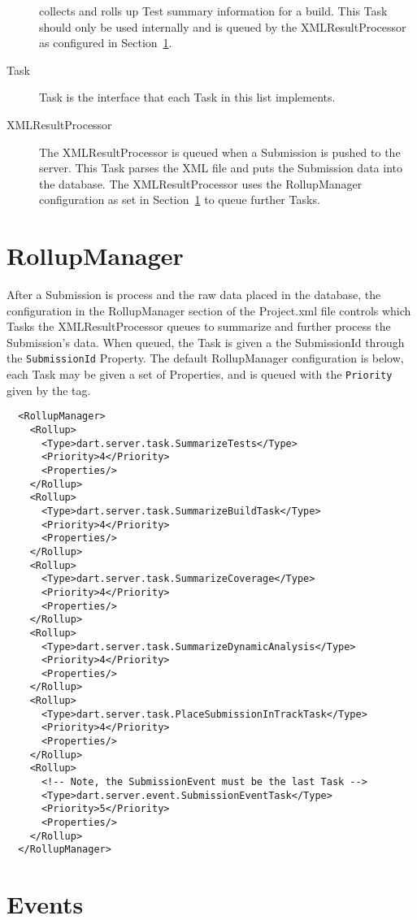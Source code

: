 \documentclass{InsightBook}
\begin{document}
\begin{description}
  collects and rolls up Test summary information for a build.
  This Task should only be used internally and is queued by the
  XMLResultProcessor as configured in Section~\ref{Section:RollupManager}.
  \item[Task] Task is the interface that each Task in this list implements.
  \item[XMLResultProcessor] The XMLResultProcessor is queued when a
  Submission is pushed to the server.  This Task parses the XML file
  and puts the Submission data into the database.  The
  XMLResultProcessor uses the RollupManager configuration as set in
  Section~\ref{Section:RollupManager} to queue further Tasks.
\end{description}

\section{RollupManager}
\label{Section:RollupManager}
After a Submission is process and the raw data placed in the database,
the configuration in the RollupManager section of the Project.xml file
controls which Tasks the XMLResultProcessor queues to summarize and
further process the Submission's data.  When queued, the Task is given
a the SubmissionId through the \texttt{SubmissionId} Property.  The
default RollupManager configuration is below, each Task may be given a
set of Properties, and is queued with the \texttt{Priority} given by
the tag.

\begin{verbatim}
  <RollupManager>
    <Rollup>
      <Type>dart.server.task.SummarizeTests</Type>
      <Priority>4</Priority>
      <Properties/>
    </Rollup>
    <Rollup>
      <Type>dart.server.task.SummarizeBuildTask</Type>
      <Priority>4</Priority>
      <Properties/>
    </Rollup>
    <Rollup>
      <Type>dart.server.task.SummarizeCoverage</Type>
      <Priority>4</Priority>
      <Properties/>
    </Rollup>
    <Rollup>
      <Type>dart.server.task.SummarizeDynamicAnalysis</Type>
      <Priority>4</Priority>
      <Properties/>
    </Rollup>
    <Rollup>
      <Type>dart.server.task.PlaceSubmissionInTrackTask</Type>
      <Priority>4</Priority>
      <Properties/>
    </Rollup>
    <Rollup>
      <!-- Note, the SubmissionEvent must be the last Task -->
      <Type>dart.server.event.SubmissionEventTask</Type>
      <Priority>5</Priority>
      <Properties/>
    </Rollup>
  </RollupManager>
\end{verbatim}

\section{Events}
\label{Section:Events}
\end{document}
